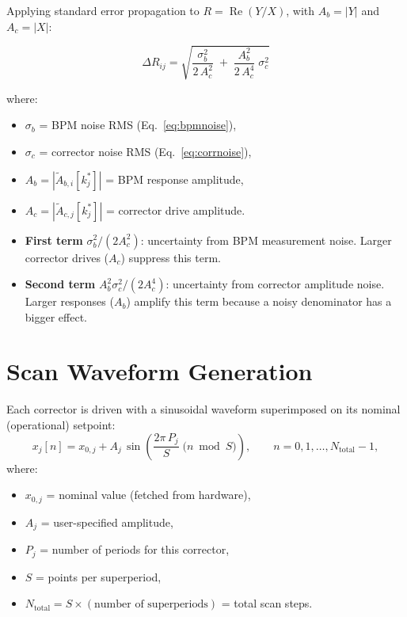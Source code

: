 \documentclass[11pt,a4paper,twoside]{report}
\begin{document}
Applying standard error propagation to $R = \operatorname{Re}(Y/X)$, with $A_b=|Y|$ and $A_c=|X|$:

\begin{equation}\label{eq:errorprop}
  \boxed{\;
  \Delta R_{ij}
  = \sqrt{
    \frac{\sigma_{b}^{2}}{2\,A_{c}^{2}}
    \;+\;
    \frac{A_{b}^{2}}{2\,A_{c}^{4}}\;\sigma_{c}^{2}
  }\;}
\end{equation}

where:
\begin{itemize}
  \item $\sigma_b$ = BPM noise RMS (Eq.~\ref{eq:bpmnoise}),
  \item $\sigma_c$ = corrector noise RMS (Eq.~\ref{eq:corrnoise}),
  \item $A_b = |\tilde{A}_{b,i}[k^*_j]|$ = BPM response amplitude,
  \item $A_c = |\tilde{A}_{c,j}[k^*_j]|$ = corrector drive amplitude.
\end{itemize}

\begin{defbox}
\begin{itemize}
  \item \textbf{First term} $\sigma_b^2 / (2A_c^2)$: uncertainty from BPM measurement noise. Larger corrector drives ($A_c$) suppress this term.
  \item \textbf{Second term} $A_b^2 \sigma_c^2 / (2A_c^4)$: uncertainty from corrector amplitude noise. Larger responses ($A_b$) amplify this term because a noisy denominator has a bigger effect.
\end{itemize}
\end{defbox}

\section{Scan Waveform Generation}\label{sec:waveform}

Each corrector is driven with a sinusoidal waveform superimposed on its nominal (operational) setpoint:
\begin{equation}\label{eq:waveform}
  x_j[n] = x_{0,j} + A_j\,\sin\!\left(
    \frac{2\pi\,P_j}{S}\;\bigl(n \bmod S\bigr)
  \right),
  \qquad n=0,1,\dots,N_{\text{total}}{-}1,
\end{equation}
where:
\begin{itemize}
  \item $x_{0,j}$ = nominal value (fetched from hardware),
  \item $A_j$ = user-specified amplitude,
  \item $P_j$ = number of periods for this corrector,
  \item $S$ = points per superperiod,
  \item $N_{\text{total}} = S \times (\text{number of superperiods})$ = total scan steps.
\end{itemize}
\end{document}
